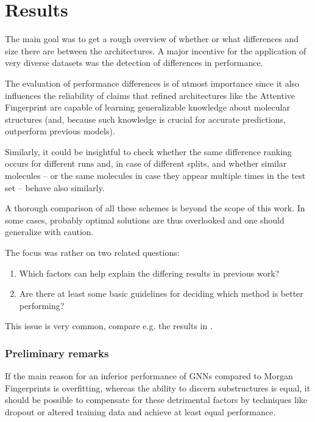 \chapter{Results}


The main goal was to get a rough overview of whether or what differences and size there are between the architectures.
A major incentive for the application of very diverse datasets was the detection of differences in performance.

The evaluation of performance differences is of utmost importance since it also influences the reliability of claims that refined architectures like the Attentive Fingerprint are capable of learning generalizable knowledge about molecular structures (and, because such knowledge is crucial for accurate predictions, outperform previous models).


Similarly, it could be insightful to check whether the same difference ranking occurs for different runs and, in case of different splits, and whether similar molecules – or the same molecules in case they appear multiple times in the test set – behave also similarly.

A thorough comparison of all these schemes is beyond the scope of this work.
In some cases, probably optimal solutions are thus overlooked and one should generalize with caution.

The focus was rather on two related questions:

\begin{enumerate}
	\item Which factors can help explain the differing results in previous work?
	\item Are there at least some basic guidelines for deciding which method is better performing?
\end{enumerate}

This issue is very common, compare e.g. the results in \cite{Jiang.2024,Liu.2025}.

\subsection{Preliminary remarks}

If the main reason for an inferior performance of GNNs compared to Morgan Fingerprints is overfitting, whereas the ability to discern substructures is equal, it should be possible to compensate for these detrimental factors by techniques like dropout or altered training data and achieve at least equal performance.

